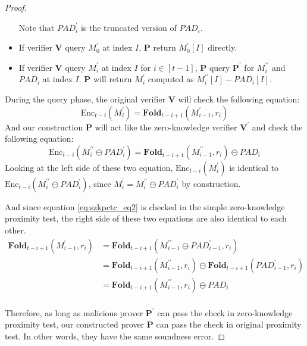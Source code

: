 \begin{proof}
\begin{itemize}
    Note that $PAD_i^\prime$ is the truncated version of $PAD_i$.
    \item If verifier \textbf{V} query $M_0^\prime$ at index $I$, \textbf{P} return $M_0^\prime[I]$ directly.
    \item If verifier \textbf{V} query $M_i^\prime$ at index $I$ for $i \in [t-1]$, \textbf{P} query $\textbf{P}^\prime$ for $M_i^{\prime\prime}$ and $PAD_i$ at index $I$. \textbf{P} will return $M_i^\prime$ computed as $M_i^{\prime\prime}[I] - PAD_i[I]$.
\end{itemize}

During the query phase, the original verifier \textbf{V} will check the following equation:
$$
    \text{Enc}_{t-i}(M_i^\prime) = \textbf{Fold}_{t-i+1}(M_{i-1}^\prime, r_i)
$$
And our construction \textbf{P} will act like the zero-knowledge verifier $\textbf{V}^\prime$ and check the following equation:
$$
    \text{Enc}_{t-i}(M_i^{\prime\prime} \ominus PAD_{i}^\prime) = \textbf{Fold}_{t-i+1}(M_{i-1}^{\prime\prime}, r_i) \ominus PAD_i
$$
Looking at the left side of these two equation, $\text{Enc}_{t-i}(M_i^\prime)$ is identical to $\text{Enc}_{t-i}(M_i^{\prime\prime} \ominus PAD_{i}^\prime)$, since $M_i^\prime = M_i^{\prime\prime} \ominus PAD_{i}^\prime$ by construction.

And since equation \ref{eq:szkpctc_eq2} is checked in the simple zero-knowledge proximity test, the right side of these two equations are also identical to each other.
\begin{align}
\textbf{Fold}_{t-i+1}(M_{i-1}^\prime, r_i) 
&= \textbf{Fold}_{t-i+1}(M_{i-1}^{\prime\prime} \ominus PAD_{i-1}^\prime, r_i) \nonumber \\
&= \textbf{Fold}_{t-i+1}(M_{i-1}^{\prime\prime}, r_i) \ominus \textbf{Fold}_{t-i+1}(PAD_{i-1}^\prime, r_i) \nonumber \\
&= \textbf{Fold}_{t-i+1}(M_{i-1}^{\prime\prime}, r_i) \ominus PAD_i \nonumber \\
\end{align}

Therefore, as long as malicious prover $\textbf{P}^\prime$ can pass the check in zero-knowledge proximity test, our constructed prover \textbf{P} can pass the check in original proximity test. In other words, they have the same soundness error.

\end{proof}
